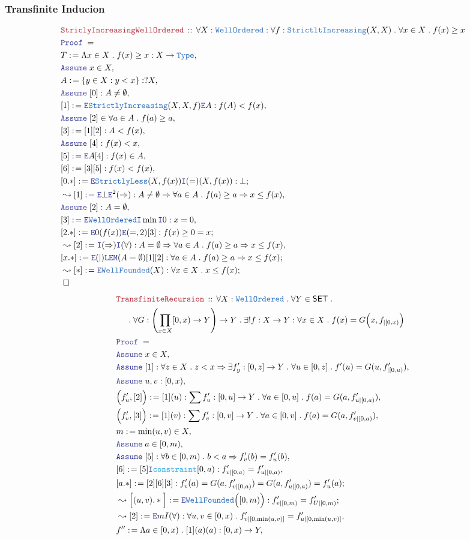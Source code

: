 \documentclass[12pt]{scrartcl}
\newcommand{\TYPE}[1]{\textcolor{NavyBlue}{\mathtt{#1}}}
\newcommand{\FUNC}[1]{\textcolor{Cerulean}{\mathtt{#1}}}
\newcommand{\LOGIC}[1]{\textcolor{Blue}{\mathtt{#1}}}
\newcommand{\THM}[1]{\textcolor{Maroon}{\mathtt{#1}}}
\renewcommand{\.}{\; . \;}
\newcommand{\de}{: \kern 0.1pc =}
\newcommand{\Theorem}[2]{& \THM{#1} \, :: \, #2 \\ & \Proof = \\ }
\newcommand{\NewLine}{\\ & \kern 1pc}
\newcommand{\Page}[1]{ \begin{align*} #1 \end{align*}   }
\newcommand{\Imply}{\Rightarrow}
\newcommand{\Intro}{\LOGIC{I}}
\newcommand{\Elim}{\LOGIC{E}}
\newcommand{\Type}{\TYPE{Type}}
\newcommand{\Say}[3]{& #1 \de #2 : #3, \\}
\newcommand{\SayIn}[3]{& #1 \de #2 \in #3, \\}
\newcommand{\Conclude}[3]{& #1 \de #2 : #3; \\}
\newcommand{\Derive}[3]{& \leadsto #1 \de #2 : #3, \\}
\newcommand{\DeriveConclude}[3]{& \leadsto #1 \de #2 : #3 ; \\}
\newcommand{\Assume}[2]{& \LOGIC{Assume} \; #1 : #2, \\}
\newcommand{\AssumeIn}[2]{& \LOGIC{Assume} \; #1 \in #2, \\}
\newcommand{\QED}{\; \square}
\newcommand{\EndProof}{& \QED \\}
\newcommand{\Proof}{\LOGIC{Proof} \; }
\newcommand{\SET}{\mathsf{SET}}
\newcommand{\WF}{\TYPE{WellFounded}}
\newcommand{\WO}{\TYPE{WellOrdered}}
\begin{document}
\subsubsection{Transfinite Inducion}
\Page{
	\Theorem{StriclyIncreasingWellOrdered}
	{
		\forall X : \WO : 
		\forall f : \TYPE{StrictltIncreasing}(X,X) \. 
		\forall x \in X \. f(x) \ge x
	}
	\Say{T}{ \Lambda x \in X \. f(x) \ge x }{X \to \Type}
	\AssumeIn{x}{X}
	\Say{A}{\{ y \in X : y < x \}}{?X}
	\Assume{[0]}{A \neq \emptyset}
	\Say{[1]}{\Elim \TYPE{StrictlyIncreasing}(X,X,f)\Elim A}{  f(A) < f(x)  }
	\AssumeIn{[2]}{\forall a \in A \. f(a) \ge a}
	\Say{[3]}{[1][2]}{ A < f(x) }
	\Assume{[4]}{f(x) < x }
	\Say{[5]}{\Elim A [4]}{f(x) \in A}
	\Say{[6]}{[3][5]}{f(x) < f(x)}
	\Conclude{[0.*]}{\Elim \TYPE{StrictlyLess}(X,f(x))\Intro(=)(X,f(x))}{\bot}
	\Derive{[1]}{\Elim \bot \Elim^2(\Imply)}{A \neq \emptyset \Imply \forall a \in A \. f(a) \ge a \Imply x \le f(x)}
	\Assume{[2]}{A = \emptyset}
	\Say{[3]}{\Elim \WO \Intro \min \Intro 0}{ x = 0 }
	\Conclude{[2.*]}{\Elim 0 (f(x))\Elim(=,2)[3]}{f(x) \ge 0 = x}
	\Derive{[2]}{\Intro(\Imply)\Intro(\forall)}
	{
		A = \emptyset \Imply \forall a \in A \. f(a) \ge a \Imply x \le f(x)
	}
	\Conclude{[x.*]}{\Elim(|)\LOGIC{LEM}(A=\emptyset)[1][2]}{\forall a \in A \. f(a) \ge a \Imply x \le f(x)}
	\DeriveConclude{[*]}{\Elim \WF(X)}{\forall x \in X \. x \le f(x)}
	\EndProof
}\Page{
	\Theorem{TransfiniteRecursion}
	{
		\forall X : \WO \.
		\forall Y \in \SET \. \NewLine \.
		\forall G : \left(\prod_{x \in X} [0,x) \to Y\right) \to Y \.
		\exists! f : X \to Y : 
		\forall x \in X \. f(x) = G\Big(x, f_{|[0,x)} \Big)
	}
	\AssumeIn{x}{X}
	\Assume{[1]}
	{
		\forall z \in X \. 
		z < x \Imply \exists f'_y : [0,z] \to Y \. 
		\forall u \in [0,z] \.f'(u) = G(u, f'_{|[0,u)}) 
	}
	\Assume{u,v}{[0,x)}
	\Say{\Big(f'_u,[2]\Big)}{[1](u)}
	{
		\sum f'_u : [0,u] \to Y \. 
		\forall a \in [0,u] \.
		f(a) = G(a, f'_{u|[0,a)})
	}
	\Say{\Big(f'_v,[3]\Big)}{[1](v)}
	{
		\sum f'_v : [0,v] \to Y \. 
		\forall a \in [0,v] \.
		f(a) = G(a, f'_{v|[0,a)})
	}
	\SayIn{m}{\min(u,v)}{X}
	\AssumeIn{a}{[0,m)}
	\Assume{[5]}{ \forall b \in [0,m)  \. b < a \Imply f'_v(b) = f'_u(b)  }
	\Say{[6]}{[5]\Intro\FUNC{constraint}[0,a)}{f'_{v|[0,a)} = f'_{u|[0,a)} }
	\Conclude{[a.*]}{[2][6][3]}{
		f'_{v}(a) = 
		G(a, f'_{v|[0,a)}) =
		G(a, f'_{u|[0,a)}) =
		f'_{u}(a)
	}
	\DeriveConclude{\Big[(u,v).*\Big]}{\Elim \WF\Big( [0,m) \Big)}
	{
		f'_{v|[0,m)} = f'_{U|[0,m)}
	}
	\Derive{[2]}{\Elim m I(\forall)}
	{
		\forall u,v \in [0,x) \. 
		f'_{v|[0,\min(u,v)]} = f'_{u|[0,\min(u,v)]}
	}
	\Say{f''}{\Lambda a \in [0,x) \. [1](a)(a)}{[0,x) \to Y }
}
\end{document}

